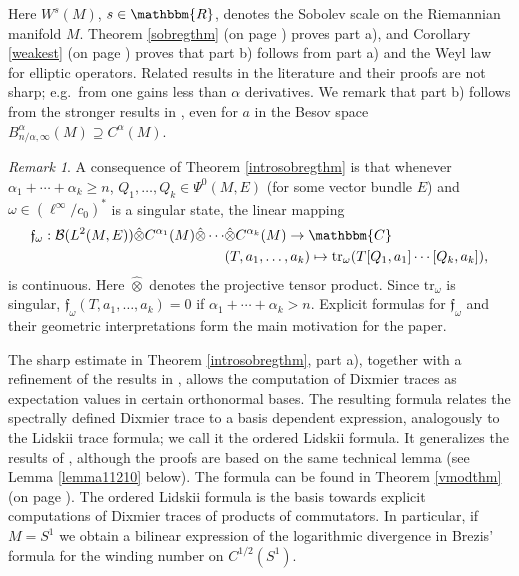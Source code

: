 \documentclass[10pt]{amsart}
\theoremstyle{remark}
\newtheorem{remark*}[thm*]{Remark}
\theoremstyle{definition}
\begin{document}
Here $W^s(M)$, $s\in {\mathbbm{R}}$, denotes the Sobolev scale on the Riemannian manifold $M$. Theorem \ref{sobregthm} (on page \pageref{sobregthm}) proves part a), and Corollary \ref{weakest} (on page \pageref{weakest}) proves that part b) follows from part a) and the Weyl law for elliptic operators. Related results in the literature and their proofs are not sharp; e.g.~from \cite{abels,marschallcpde} one gains less than $\alpha$ derivatives. We remark that part b) follows from the stronger results in \cite{rochbergsemmes}, even for $a$ in the Besov space $B^\alpha_{n/\alpha,\infty}(M)\supseteq C^\alpha(M)$.

\begin{remark*}
\label{introsobregrem}
A consequence of Theorem \ref{introsobregthm} is that whenever $\alpha_1+\cdots +\alpha_k\geq n$, $Q_1, \dots, Q_k\in \Psi^0(M,E)$ (for some vector bundle $E$) and $\omega\in (\ell^\infty/c_0)^*$ is a singular state, the linear mapping 
\begin{align*}
\mathfrak{f}_\omega: {\mathcal{B}}(L^2(M,E))\hat{\otimes} C^{\alpha_1}(M)\hat{\otimes}\cdots &\hat{\otimes}C^{\alpha_k}(M)\to {\mathbbm{C}}\\
&(T,a_1,\dots, a_k) \mapsto {\mathrm{t}\mathrm{r}}_\omega (T[Q_1,a_1]\cdots [Q_k,a_k]),
\end{align*}
is continuous. Here $\hat{\otimes}$ denotes the projective tensor product. Since ${\mathrm{t}\mathrm{r}}_\omega$ is singular, $\mathfrak{f}_\omega(T,a_1,\dots, a_k)=0$ if $\alpha_1+\cdots +\alpha_k>n$. Explicit formulas for $\mathfrak{f}_\omega$ and their geometric interpretations form the main motivation for the paper.
\end{remark*}

The sharp estimate in Theorem \ref{introsobregthm}, part a), together with a refinement of the results in \cite[Chapter 11.2]{sukolord}, allows the computation of Dixmier traces as expectation values in certain orthonormal bases. The resulting formula relates the spectrally defined Dixmier trace to a basis dependent expression, analogously to the Lidskii trace formula; we call it the ordered Lidskii formula. It generalizes the results of \cite[Chapter 11.2]{sukolord}, although the proofs are based on the same technical lemma (see Lemma \ref{lemma11210} below). The formula can be found in Theorem \ref{vmodthm} (on page \pageref{vmodthm}). The ordered Lidskii formula is the basis towards explicit computations of Dixmier traces of products of commutators. In particular, if $M=S^1$ we obtain a bilinear expression of the logarithmic divergence in Brezis' formula for the winding number \cite{kahanewindandfour} on $C^{1/2}(S^1)$. 
\end{document}
